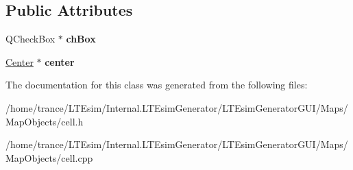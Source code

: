 \subsection*{Public Attributes}
\begin{DoxyCompactItemize}
\item 
Q\+Check\+Box $\ast$ {\bfseries ch\+Box}\hypertarget{class_cell_a97d2b6ab648a792b85c2276b873ae9e5}{}\label{class_cell_a97d2b6ab648a792b85c2276b873ae9e5}

\item 
\hyperlink{class_center}{Center} $\ast$ {\bfseries center}\hypertarget{class_cell_ab1700f50315b4937b21ebc8518516cd1}{}\label{class_cell_ab1700f50315b4937b21ebc8518516cd1}

\end{DoxyCompactItemize}


The documentation for this class was generated from the following files\+:\begin{DoxyCompactItemize}
\item 
/home/trance/\+L\+T\+Esim/\+Internal.\+L\+T\+Esim\+Generator/\+L\+T\+Esim\+Generator\+G\+U\+I/\+Maps/\+Map\+Objects/cell.\+h\item 
/home/trance/\+L\+T\+Esim/\+Internal.\+L\+T\+Esim\+Generator/\+L\+T\+Esim\+Generator\+G\+U\+I/\+Maps/\+Map\+Objects/cell.\+cpp\end{DoxyCompactItemize}
